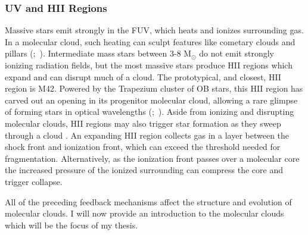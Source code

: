 \subsubsection{UV and HII Regions}\label{sec:uv}
Massive stars emit strongly in the FUV, which heats and ionizes surrounding gas. In a molecular cloud, such heating can sculpt features like cometary clouds and pillars (\citet{1983A&A...117..183R};~\citet{Walawender04}). Intermediate mass stars between 3-8 M$_\odot$ do not emit strongly ionizing radiation fields, but the most massive stars produce HII regions which expand and can disrupt much of a cloud. The prototypical, and closest, HII region is M42. Powered by the Trapezium cluster of OB stars, this HII region has carved out an opening in its progenitor molecular cloud, allowing a rare glimpse of forming stars in optical wavelengths (\citet{Odell93};~\citet{Ricci_2008}). Aside from ionizing and disrupting molecular clouds, HII regions may also trigger star formation as they sweep through a cloud \cite{Deharveng_2010}. An expanding HII region collects gas in a layer between the shock front and ionization front, which can exceed the threshold needed for fragmentation. Alternatively, as the ionization front passes over a molecular core the increased pressure of the ionized surrounding can compress the core and trigger collapse.

All of the preceding feedback mechanisms affect the structure and evolution of molecular clouds. I will now provide an introduction to the molecular clouds which will be the focus of my thesis.





  